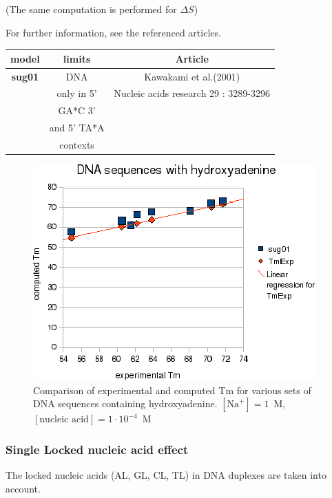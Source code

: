 \documentclass{article}
\begin{document}
       (The same computation is performed for $\Delta S$) 
       
For further information, see the referenced articles.

\begin{table}[hc]
\begin{tabular}[h]{| c | c | c |}
\textbf{model} & \textbf{limits} & \textbf{Article} \\
\hline
\textbf{sug01} & DNA & Kawakami et al.(2001)\\
 & only in 5' & Nucleic acids research 29 : 3289-3296\\
 & GA*C 3' & \\
 & and 5' TA*A & \\
 & contexts & \\
 \hline
\end{tabular}
\end{table}

\begin{figure}[h]
\includegraphics[width=1\linewidth]{images/Hydroxyadenine}
\caption{Comparison of experimental and computed Tm for various sets of
 DNA sequences containing hydroxyadenine. $[\mbox{Na}^+] = 1$~M, $[\mbox{nucleic acid}] = 1\cdot{}10^{-4}$~M}
\end{figure}
\pagebreak

\subsubsection{Single Locked nucleic acid effect}

The locked nucleic acids (AL, GL, CL, TL) in DNA duplexes are taken into account.
\end{document}

